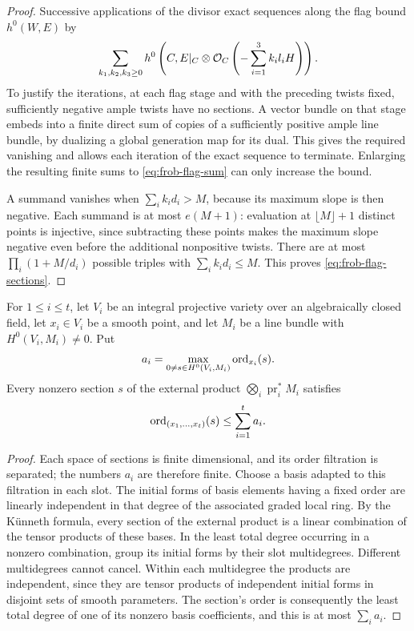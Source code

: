 \begin{proof}
Successive applications of the divisor exact sequences along the flag
bound $h^0(W,E)$ by
\begin{equation}\label{eq:frob-flag-sum}
 \sum_{k_1,k_2,k_3\ge0}
 h^0\left(C,E|_C\otimes
 \mathcal O_C\left(-\sum_{i=1}^3 k_i l_iH\right)\right).
\end{equation}
To justify the iterations, at each flag stage and with the preceding
twists fixed, sufficiently negative ample twists have no sections.  A
vector bundle on that stage embeds into a finite direct sum of copies
of a sufficiently positive ample line bundle, by dualizing a global
generation map for its dual.  This gives the required vanishing and
allows each iteration of the exact sequence to terminate.  Enlarging
the resulting finite sums to \eqref{eq:frob-flag-sum} can only increase
the bound.

A summand vanishes when $\sum_i k_i d_i>M$, because its maximum slope is
then negative.  Each summand is at most $e(M+1)$: evaluation at
$\lfloor M\rfloor+1$ distinct points is injective, since subtracting
these points makes the maximum slope negative even before the additional
nonpositive twists.  There are at most
$\prod_i(1+M/d_i)$ possible triples with $\sum_i k_i d_i\le M$.
This proves \eqref{eq:frob-flag-sections}.
\end{proof}

\begin{lemma}\label{lem:frob-external-orders}
For $1\le i\le t$, let $V_i$ be an integral projective variety over an
algebraically closed field, let $x_i\in V_i$ be a smooth point, and let
$M_i$ be a line bundle with $H^0(V_i,M_i)\ne0$.  Put
\[
 a_i=\max_{0\ne s\in H^0(V_i,M_i)}\operatorname{ord}_{x_i}(s).
\]
Every nonzero section $s$ of the external product
$\bigotimes_i\operatorname{pr}_i^*M_i$ satisfies
\[
 \operatorname{ord}_{(x_1,\ldots,x_t)}(s)\le\sum_{i=1}^t a_i.
\]
\end{lemma}

\begin{proof}
Each space of sections is finite dimensional, and its order filtration
is separated; the numbers $a_i$ are therefore finite.  Choose a basis
adapted to this filtration in each slot.  The initial forms of basis
elements having a fixed order are linearly independent in that degree
of the associated graded local ring.  By the K\"unneth formula, every
section of the external product is a linear combination of the tensor
products of these bases.  In the least total degree occurring in a
nonzero combination, group its initial forms by their slot multidegrees.
Different multidegrees cannot cancel.  Within each multidegree the
products are independent, since they are tensor products of independent
initial forms in disjoint sets of smooth parameters.  The section's
order is consequently the least total degree of one of its nonzero
basis coefficients, and this is at most $\sum_i a_i$.
\end{proof}

